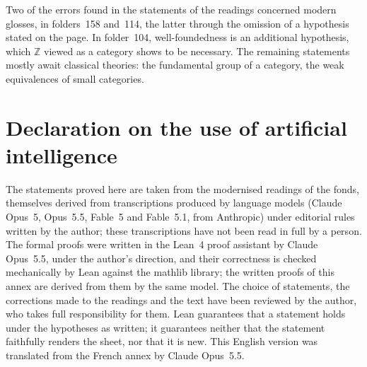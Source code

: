 \documentclass[11pt]{article}
\theoremstyle{plain}
\theoremstyle{definition}
\theoremstyle{remark}
\begin{document}
Two of the errors found in the statements of the readings concerned modern glosses, in folders~158 and~114, the latter through the omission of a hypothesis stated on the page. In folder~104, well-foundedness is an additional hypothesis, which $\mathbb Z$ viewed as a category shows to be necessary. The remaining statements mostly await classical theories: the fundamental group of a category, the weak equivalences of small categories.

\section*{Declaration on the use of artificial intelligence}

The statements proved here are taken from the modernised readings of the fonds, themselves derived from transcriptions produced by language models (Claude Opus~5, Opus~5.5, Fable~5 and Fable~5.1, from Anthropic) under editorial rules written by the author; these transcriptions have not been read in full by a person. The formal proofs were written in the Lean~4 proof assistant by Claude Opus~5.5, under the author's direction, and their correctness is checked mechanically by Lean against the mathlib library; the written proofs of this annex are derived from them by the same model. The choice of statements, the corrections made to the readings and the text have been reviewed by the author, who takes full responsibility for them. Lean guarantees that a statement holds under the hypotheses as written; it guarantees neither that the statement faithfully renders the sheet, nor that it is new. This English version was translated from the French annex by Claude Opus~5.5.
\end{document}
